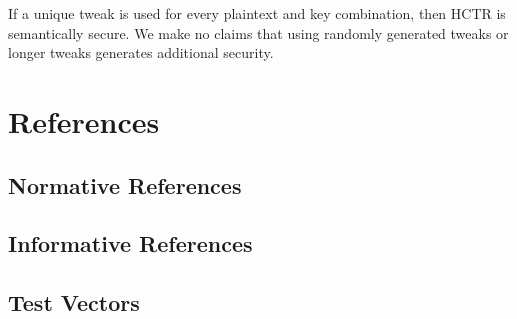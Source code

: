 \documentclass[i-d]{rfc}
\begin{document}
If a unique tweak is used for every plaintext and key combination, then HCTR is semantically secure. We make no claims that using randomly generated tweaks or longer tweaks generates additional security.


\section{References}
\nocite{*}
\subsection{Normative References}
\printbibliography[heading=none,keyword=normative]

\subsection{Informative References}
\printbibliography[heading=none,keyword=informative]

\begin{appendices}
\section{Test Vectors}
\end{appendices}
\end{document}

